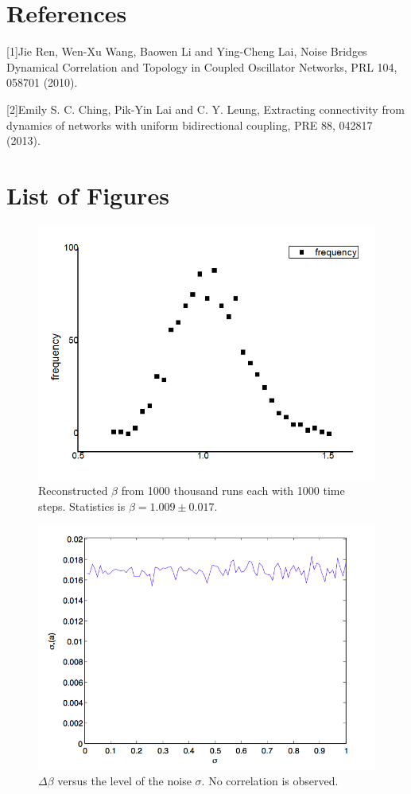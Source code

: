 \documentclass[11pt,a4paper]{article}
\begin{document}
\section{References}
[1]Jie Ren, Wen-Xu Wang, Baowen Li and Ying-Cheng Lai, Noise Bridges Dynamical Correlation and Topology in Coupled Oscillator Networks, PRL 104, 058701 (2010).

[2]Emily S. C. Ching, Pik-Yin Lai and C. Y. Leung, Extracting connectivity from dynamics of networks with uniform bidirectional coupling, PRE 88, 042817 (2013).

\section{List of Figures}
\begin{figure}
    \centering
    \includegraphics[scale=0.7]{figure2-03}
    \caption{Reconstructed $\beta$ from 1000 thousand runs each with 1000 time steps. Statistics is $\beta=1.009\pm0.017$.}
    \label{fig:1}
\end{figure}

\begin{figure}
    \centering
    \includegraphics[scale=0.65]{Fig2-04}
    \caption{$\Delta \beta$ versus the level of the noise $\sigma$. No correlation is observed.}
    \label{fig:2}
\end{figure}
\end{document}
